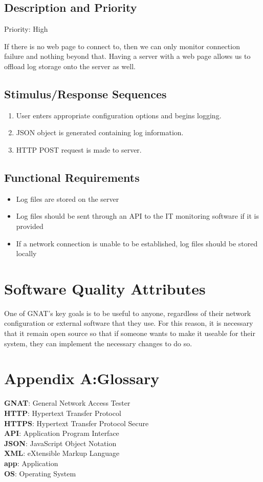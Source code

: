 \documentclass{scrreprt}
\begin{document}
\subsection{Description and Priority}

Priority: High

If there is no web page to connect to, then we can only monitor connection failure and nothing beyond that. Having a server with a web page allows us to offload log storage onto the server as well.

\subsection{Stimulus/Response Sequences}

\begin{enumerate}
  \item User enters appropriate configuration options and begins logging.
\item JSON object is generated containing log information.
  \item HTTP POST request is made to server.
\end{enumerate}

\subsection{Functional Requirements}

\begin{itemize}
\item Log files are stored on the server
\item Log files should be sent through an API to the IT monitoring software if it is provided
\item If a network connection is unable to be established, log files should be stored locally
\end{itemize}

\section{Software Quality Attributes}
One of GNAT's key goals is to be useful to anyone, regardless of their network configuration or external software that they use.  For this reason, it is necessary that it remain open source so that if someone wants to make it useable for their system, they can implement the necessary changes to do so.

\section{Appendix A:\@ Glossary}
\textbf{GNAT}: General Network Access Tester\\
\textbf{HTTP}: Hypertext Transfer Protocol\\
\textbf{HTTPS}: Hypertext Transfer Protocol Secure\\
\textbf{API}: Application Program Interface\\
\textbf{JSON}: JavaScript Object Notation\\
\textbf{XML}: eXtensible Markup Language\\
\textbf{app}: Application\\
\textbf{OS}: Operating System\\
\end{document}
